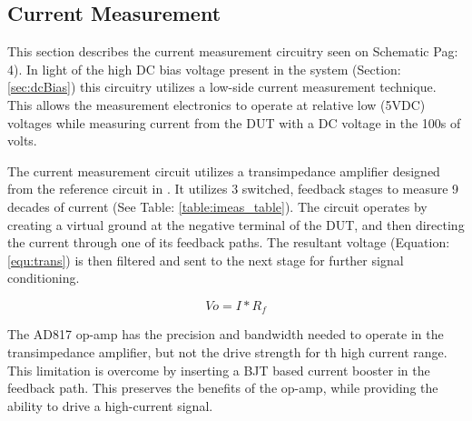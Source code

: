 \subsection{Current Measurement}
\label{sec:iMeas}

This section describes the current measurement circuitry seen on Schematic Pag: 4). In light of the high DC bias voltage present in the system (Section: \ref{sec:dcBias}) this circuitry utilizes a low-side current measurement technique. This allows the measurement electronics to operate at relative low (5VDC) voltages while measuring current from the DUT with a DC voltage in the 100s of volts.



The current measurement circuit utilizes a transimpedance amplifier designed from the reference circuit in \cite{steve_thesis}. It utilizes 3 switched, feedback stages to measure 9 decades of current (See Table: \ref{table:imeas_table}). The circuit operates by creating a virtual ground at the negative terminal of the DUT, and then directing the current through one of its feedback paths. The resultant voltage (Equation: \eqref{equ:trans}) is then filtered and sent to the next stage for further signal conditioning.

\begin{equation}
\label{equ:trans}
Vo = I*R_f
\end{equation}

The AD817 op-amp has the precision and bandwidth needed to operate in the transimpedance amplifier, but not the drive strength for th high current range. This limitation is overcome by inserting a BJT based current booster in the feedback path. This preserves the benefits of the op-amp, while providing the ability to drive a high-current signal.

